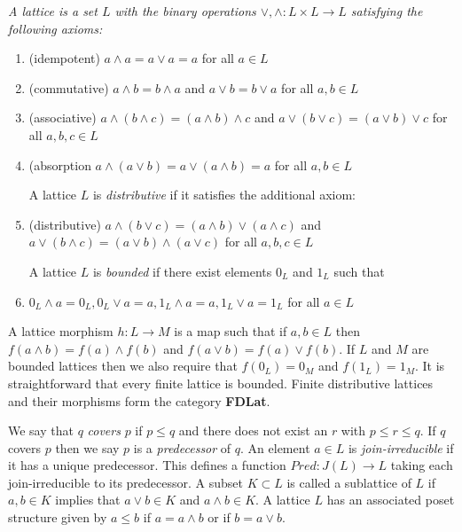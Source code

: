 \begin{defn}
{\em
A {\em lattice} is a set $L$ with the binary operations $\vee,\wedge:L\times L\to L$ satisfying the following axioms:

\begin{enumerate}
\item (idempotent) $a\wedge a = a \vee a = a$ for all $a\in L$
\item (commutative) $a\wedge b = b\wedge a$ and $a\vee b = b \vee a$ for all $a,b\in L$
\item (associative) $a\wedge (b\wedge c) = (a\wedge b)\wedge c$ and $a\vee(b\vee c) = (a\vee b)\vee c$ for all $a,b,c\in L$
\item (absorption $a\wedge (a\vee b) = a\vee (a\wedge b)=a$ for all $a,b\in L$

A lattice $L$ is {\em distributive} if it satisfies the additional axiom:

\item (distributive) $a\wedge (b\vee c) = (a\wedge b)\vee (a\wedge c)$ and $a\vee (b\wedge c) = (a\vee b) \wedge (a\vee c)$ for all $a,b,c\in L$

A lattice $L$ is {\em bounded} if there exist elements $0_L$ and $1_L$ such that

\item $0_L\wedge a = 0_L, 0_L\vee a = a, 1_L\wedge a = a, 1_L\vee a = 1_L$ for all $a\in L$
\end{enumerate}
}
\end{defn}

A lattice morphism $h:L\to M$ is a map such that if $a,b\in L$ then $f(a\wedge b) = f(a)\wedge f(b)$ and $f(a\vee b) = f(a)\vee f(b)$.  If $L$ and $M$ are bounded lattices then we also require that $f(0_L)=0_M$ and $f(1_L)=1_M$.    It is straightforward that every finite lattice is bounded. Finite distributive lattices and their morphisms form the category {\bf FDLat}.

We say that $q$ {\em covers} $p$ if $p\leq q$ and there does not exist an $r$ with $p\leq r \leq q$.  If $q$ covers $p$ then we say $p$ is a {\em predecessor} of $q$.  An element $a\in L$ is {\em join-irreducible} if it has a unique predecessor.   This defines a function $Pred:J(L)\to L$ taking each join-irreducible to its predecessor.  A subset $K\subset L$ is called a sublattice of $L$ if $a,b\in K$ implies that $a\vee b\in K$ and $a\wedge b\in K$.  A lattice $L$ has an associated poset structure given by $a\leq b$ if $a=a\wedge b$ or if $b=a\vee b$.

%

